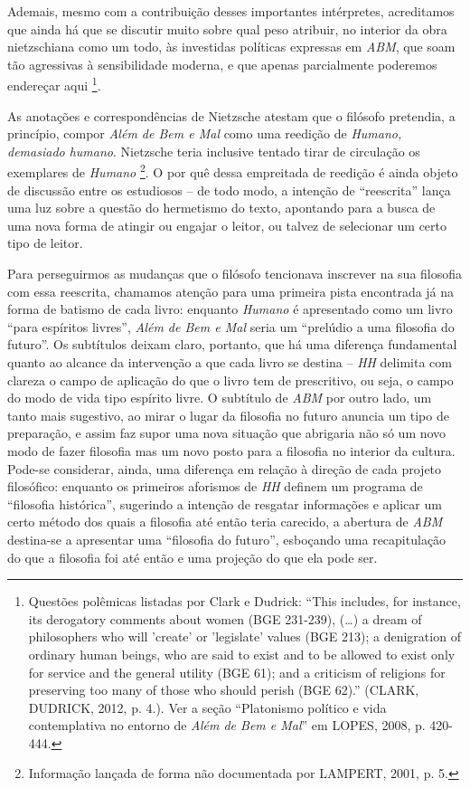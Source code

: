 \documentclass[
	12pt,				%
	openright,			%
	oneside,			%
	a4paper,			%
	english,			%
	french,				%
	spanish,			%
	brazil				%
	]{abntex2}
\begin{document}
	Ademais, mesmo com a contribuição desses importantes intérpretes, acreditamos que ainda há que se discutir muito sobre qual peso atribuir, no interior da obra nietzschiana como um todo, às investidas políticas expressas em \textit{ABM}, que soam tão agressivas à sensibilidade moderna, e que apenas parcialmente poderemos endereçar aqui
\footnote{Questões polêmicas listadas por Clark e Dudrick: “This includes, for instance, its derogatory comments about women (BGE 231-239), (…) a dream of philosophers who will 'create' or 'legislate' values (BGE 213); a denigration of ordinary human beings, who are said to exist and to be allowed to exist only for service and the general utility (BGE 61); and a criticism of religions for preserving too many of those who should perish (BGE 62).” (CLARK, DUDRICK, 2012, p. 4.). Ver a seção “Platonismo político e vida contemplativa no entorno de \textit{Além de Bem e Mal}” em LOPES, 2008, p. 420-444.}.

As anotações e correspondências de Nietzsche atestam que o filósofo pretendia, a princípio, compor \textit{Além de Bem e Mal} como uma reedição de \textit{Humano, demasiado humano}. Nietzsche teria inclusive tentado tirar de circulação os exemplares de \textit{Humano}
\footnote{Informação lançada de forma não documentada por LAMPERT, 2001, p. 5.}. O por quê dessa empreitada de reedição é ainda objeto de discussão entre os estudiosos – de todo modo, a intenção de “reescrita” lança uma luz sobre a questão do hermetismo do texto, apontando para a busca de uma nova forma de atingir ou engajar o leitor, ou talvez de selecionar um certo tipo de leitor. 

	Para perseguirmos as mudanças que o filósofo tencionava inscrever na sua filosofia com essa reescrita, chamamos atenção para uma primeira pista encontrada já na forma de batismo de cada livro: enquanto \textit{Humano} é apresentado como um livro “para espíritos livres”, \textit{Além de Bem e Mal} seria um “prelúdio a uma filosofia do futuro”. Os subtítulos deixam claro, portanto, que há uma diferença fundamental quanto ao alcance da intervenção a que cada livro se destina – \textit{HH} delimita com clareza o campo de aplicação do que o livro tem de prescritivo, ou seja, o campo do modo de vida tipo espírito livre. O subtítulo de \textit{ABM} por outro lado, um tanto mais sugestivo, ao mirar o lugar da filosofia no futuro anuncia um tipo de preparação, e assim faz supor uma nova situação que abrigaria não só um novo modo de fazer filosofia mas um novo posto para a filosofia no interior da cultura. Pode-se considerar, ainda, uma diferença em relação à direção de cada projeto filosófico: enquanto os primeiros aforismos de \textit{HH} definem um programa de “filosofia histórica”, sugerindo a intenção de resgatar informações e aplicar um certo método dos quais a filosofia até então teria carecido, a abertura de \textit{ABM} destina-se a apresentar uma “filosofia do futuro”, esboçando uma recapitulação do que a filosofia foi até então e uma projeção do que ela pode ser.
	
\end{document}
